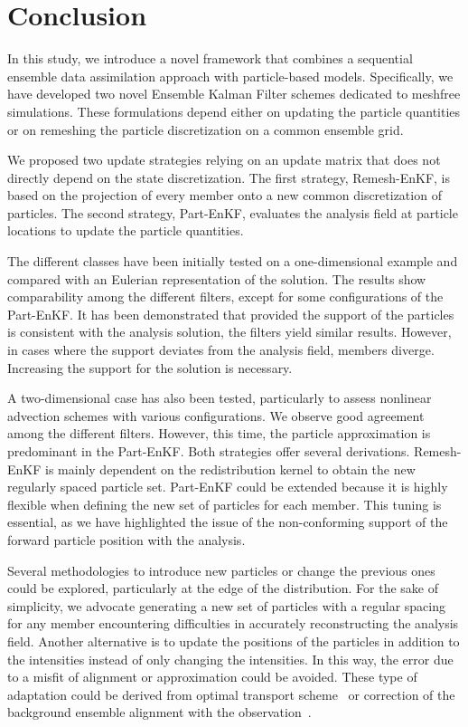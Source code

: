 
\section{Conclusion}
In this study, we introduce a novel framework that combines a sequential ensemble data assimilation approach with particle-based models. Specifically, we have developed two novel Ensemble Kalman Filter schemes dedicated to meshfree simulations. These formulations depend either on updating the particle quantities or on remeshing the particle discretization on a common ensemble grid.

We proposed two update strategies relying on an update matrix that does not directly depend on the state discretization. The first strategy, Remesh-EnKF, is based on the projection of every member onto a new common discretization of particles. The second strategy, Part-EnKF, evaluates the analysis field at particle locations to update the particle quantities.

The different classes have been initially tested on a one-dimensional example and compared with an Eulerian representation of the solution. The results show comparability among the different filters, except for some configurations of the Part-EnKF. It has been demonstrated that provided the support of the particles is consistent with the analysis solution, the filters yield similar results. However, in cases where the support deviates from the analysis field, members diverge. Increasing the support for the solution is necessary.

A two-dimensional case has also been tested, particularly to assess nonlinear advection schemes with various configurations. We observe good agreement among the different filters. However, this time, the particle approximation is predominant in the Part-EnKF.
Both strategies offer several derivations. Remesh-EnKF is mainly dependent on the redistribution kernel to obtain the new regularly spaced particle set. Part-EnKF could be extended because it is highly flexible when defining the new set of particles for each member. This tuning is essential, as we have highlighted the issue of the non-conforming support of the forward particle position with the analysis.

Several methodologies to introduce new particles or change the previous ones could be explored, particularly at the edge of the distribution.
For the sake of simplicity, we advocate generating a new set of particles with a regular spacing for any member encountering difficulties in accurately reconstructing the analysis field.
Another alternative is to update the positions of the particles in addition to the intensities instead of only changing the intensities. In this way, the error due to a misfit of alignment or approximation could be avoided. These type of adaptation could be derived from optimal transport scheme~\cite{bocquet_bridging_2023} or correction of the background ensemble alignment with the observation~\cite{ravela_data_2007,rosenthal_displacement_2017}.

\newpage